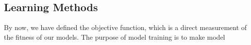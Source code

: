 \subsection {Learning Methods}
By now, we have defined the objective function, which is a direct measurement of the fitness of our models. The purpose of model training is to make model 